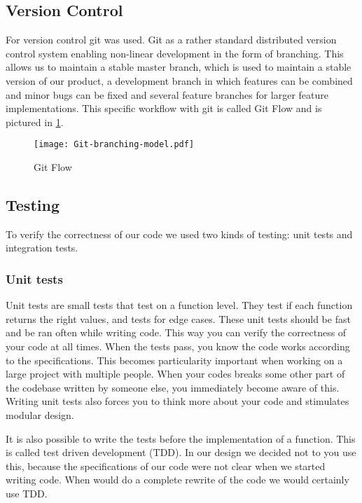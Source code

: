 \documentclass[a4paper, openany, oneside]{memoir}
\begin{document}
\subsection{Version Control}
\label{sec:version-control}
For version control git was used. Git as a rather standard distributed version control system enabling non-linear development in the form of branching. This allows us to maintain a stable master branch, which is used to maintain a stable version of our product, a development branch in which features can be combined and minor bugs can be fixed and several feature branches for larger feature implementations. This specific workflow with git is called Git Flow\cite{driessen2010successful} and is pictured in \cref{fig:gitflow}.


\begin{figure}[h]
    \centering
    \texttt{[image: Git-branching-model.pdf]}
    \caption{Git Flow}
    \label{fig:gitflow}
\end{figure}

\subsection{Testing}
\label{sec:testing}
To verify the correctness of our code we used two kinds of testing: unit tests and integration tests.

\subsubsection{Unit tests}
Unit tests are small tests that test on a function level. They test if each function returns the right values, and tests for edge cases. These unit tests should be fast and be ran often while writing code. This way you can verify the correctness of your code at all times. When the tests pass, you know the code works according to the specifications. This becomes particularity important when working on a large project with multiple people. When your codes breaks some other part of the codebase written by someone else, you immediately become aware of this. Writing unit tests also forces you to think more about your code and stimulates modular design.

It is also possible to write the tests before the implementation of a function. This is called test driven development (TDD). In our design we decided not to you use this, because the specifications of our code were not clear when we started writing code. When would do a complete rewrite of the code we would certainly use TDD.
\end{document}
